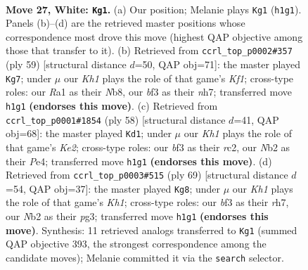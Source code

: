 \documentclass[11pt]{article}
\begin{document}
\clearpage

\begin{figure}[p]\centering
\begin{subfigure}{0.46\textwidth}\centering
\resizebox{\linewidth}{!}{%
\newchessgame
\chessboard[
  setfen={1n2k3/8/8/ppb2p2/8/5b2/PN3r2/R4R1K w - - 0 27},
  showmover=false,
  pgfstyle=straightmove, color=movearrow, markmove={h1-g1}
]}
\caption{}
\end{subfigure}\hfill
\begin{subfigure}{0.46\textwidth}\centering
\resizebox{\linewidth}{!}{%
\newchessgame
\chessboard[
  setfen={1n2rk2/7N/3P2p1/8/5P2/p3R3/r5PP/6K1 b - - 0 30},
  showmover=false,
  pgfstyle=straightmove, color=movearrow, markmove={f8-g7}
]}
\caption{}
\end{subfigure}
\\[4pt]
\begin{subfigure}{0.46\textwidth}\centering
\resizebox{\linewidth}{!}{%
\newchessgame
\chessboard[
  setfen={1r6/4k1pp/8/3Bb3/1R2P2P/8/2r1K1P1/1R6 w - - 1 30},
  showmover=false,
  pgfstyle=straightmove, color=movearrow, markmove={e2-d1}
]}
\caption{}
\end{subfigure}\hfill
\begin{subfigure}{0.46\textwidth}\centering
\resizebox{\linewidth}{!}{%
\newchessgame
\chessboard[
  setfen={7k/1R5R/p7/6p1/8/6P1/r1r3P1/6K1 b - - 5 35},
  showmover=false,
  pgfstyle=straightmove, color=movearrow, markmove={h8-g8}
]}
\caption{}
\end{subfigure}
\caption{\textbf{Move 27, White: \texttt{Kg1}.} (a) Our position; Melanie plays \texttt{Kg1} (\texttt{h1g1}). Panels (b)--(d) are the retrieved master positions whose correspondence most drove this move (highest QAP objective among those that transfer to it). (b) Retrieved from \texttt{ccrl\_top\_p0002\#357} (ply 59) [structural distance $d$=50, QAP obj=71]: the master played \texttt{Kg7}; under $\mu$ our \emph{Kh1} plays the role of that game's \emph{Kf1}; cross-type roles: our \emph{R}a1 as their \emph{N}b8, our \emph{b}f3 as their \emph{n}h7; transferred move \texttt{h1g1} \textbf{(endorses this move)}. (c) Retrieved from \texttt{ccrl\_top\_p0001\#1854} (ply 58) [structural distance $d$=41, QAP obj=68]: the master played \texttt{Kd1}; under $\mu$ our \emph{Kh1} plays the role of that game's \emph{Ke2}; cross-type roles: our \emph{b}f3 as their \emph{r}c2, our \emph{N}b2 as their \emph{P}e4; transferred move \texttt{h1g1} \textbf{(endorses this move)}. (d) Retrieved from \texttt{ccrl\_top\_p0003\#515} (ply 69) [structural distance $d$=54, QAP obj=37]: the master played \texttt{Kg8}; under $\mu$ our \emph{Kh1} plays the role of that game's \emph{Kh1}; cross-type roles: our \emph{b}f3 as their \emph{r}h7, our \emph{N}b2 as their \emph{p}g3; transferred move \texttt{h1g1} \textbf{(endorses this move)}. Synthesis: 11 retrieved analogs transferred to \texttt{Kg1} (summed QAP objective 393, the strongest correspondence among the candidate moves); Melanie committed it via the \texttt{search} selector.}
\label{fig:thought-m52}
\end{figure}
\end{document}
